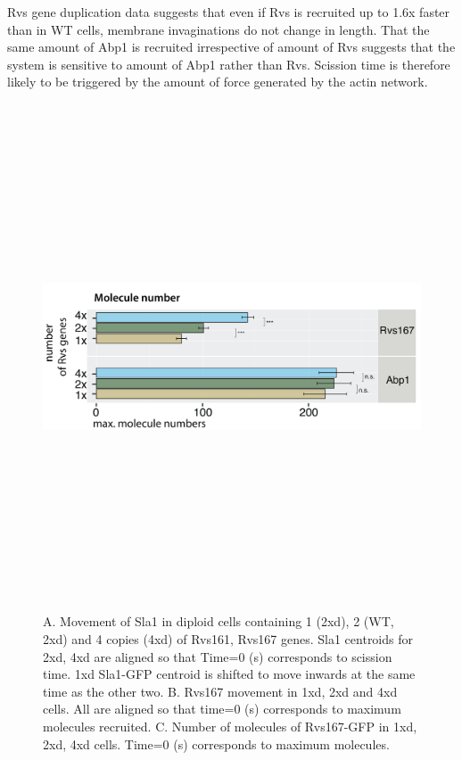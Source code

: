 Rvs gene duplication data suggests that even if Rvs is recruited up to 1.6x faster than in WT cells, membrane invaginations do not change in length. That the same amount of Abp1 is recruited irrespective of amount of Rvs suggests that the system is sensitive to amount of Abp1 rather than Rvs. Scission time is therefore likely to be triggered by the amount of force generated by the actin network. 


\vspace{3mm}
	\begin{figure}[H]
	\centering
	\includegraphics[width=15cm,height=15cm,keepaspectratio]{figures/results_final/protein_frictionB_4}
	\vspace*{2mm}
	\caption[Titration of Rvs molecule numbers in diploid cells]
	{A. Movement of Sla1 in diploid cells containing 1 (2xd), 2 (WT, 2xd) and 4 copies (4xd) of Rvs161, Rvs167 genes. Sla1 centroids for 2xd, 4xd are aligned so that Time=0 (s) corresponds to scission time. 1xd Sla1-GFP centroid is shifted to move inwards at the same time as the other two.
		B. Rvs167 movement in 1xd, 2xd and 4xd cells. All are aligned so that time=0 (s) corresponds to maximum molecules recruited.
		C.  Number of molecules of Rvs167-GFP in 1xd, 2xd, 4xd cells. Time=0 (s) corresponds to maximum molecules. 
		\label{fig_rvsdiploid2}}
\end{figure}




